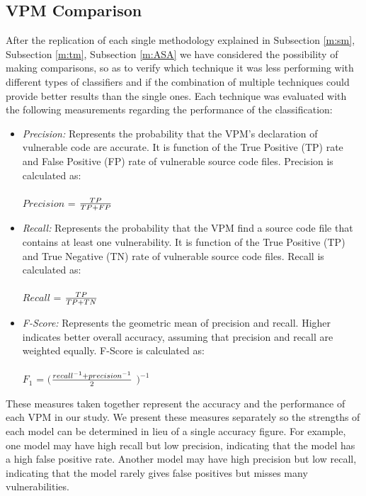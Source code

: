 \documentclass[twocolumn,10pt]{asme2ej}
\begin{document}
\subsection{VPM Comparison}
\label{m:comparison}
After the replication of each single methodology explained in Subsection \ref{m:sm}, Subsection \ref{m:tm}, Subsection \ref{m:ASA} we have considered the possibility of making comparisons, so as to verify which technique it was less performing with different types of classifiers and if the combination of multiple techniques could provide better results than the single ones.
Each technique was evaluated with the following measurements regarding the performance of the classification:
\begin{itemize}
    \item \textbullet \textit{Precision:} Represents the probability that the VPM's declaration of vulnerable code are accurate. It is function of the True Positive (TP) rate and False Positive (FP) rate of vulnerable source code files. Precision is calculated as:\\
    \\${Precision }$ = {\Large ${ TP \over TP + FP}$}
    \\\item \textbullet \textit{Recall:} Represents the probability that the VPM find a source code file that contains at least one vulnerability. It is function of the True Positive (TP) and True Negative (TN) rate of vulnerable source code files. Recall is calculated as:\\
    \\${Recall }$ = {\Large ${ TP \over TP + TN}$}
    \\\item \textbullet \textit{F-Score:} Represents the geometric mean of precision and recall. Higher indicates better overall accuracy, assuming that precision and recall are weighted equally. F-Score is calculated as:\\
    \\${F_1 }$ = {$\bigg($\Large ${recall^{-1} + precision^{-1} \over 2 }$} $\bigg)^{-1}$\\


\end{itemize}
These measures taken together represent the accuracy and the performance of each VPM in our study. We present these measures separately so the strengths of each model can be determined in lieu of a single accuracy figure. For example, one model may have high recall but low precision, indicating that the model has a high false positive rate. Another model may have high precision but low recall, indicating that the model rarely gives false positives but misses many vulnerabilities.
\end{document}
